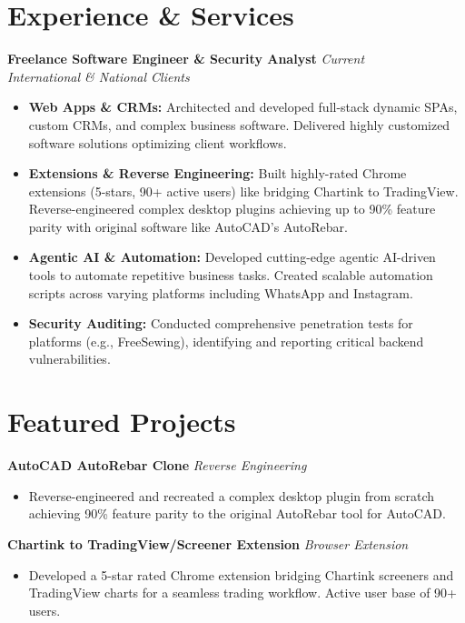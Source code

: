 \documentclass[11pt,a4paper]{article}
\begin{document}
\section{Experience \& Services}
\textbf{Freelance Software Engineer \& Security Analyst} \hfill \textit{Current} \\
\textit{International \& National Clients}
\begin{itemize}[leftmargin=0.25in]
    \item \textbf{Web Apps \& CRMs:} Architected and developed full-stack dynamic SPAs, custom CRMs, and complex business software. Delivered highly customized software solutions optimizing client workflows.
    \item \textbf{Extensions \& Reverse Engineering:} Built highly-rated Chrome extensions (5-stars, 90+ active users) like bridging Chartink to TradingView. Reverse-engineered complex desktop plugins achieving up to 90\% feature parity with original software like AutoCAD's AutoRebar.
    \item \textbf{Agentic AI \& Automation:} Developed cutting-edge agentic AI-driven tools to automate repetitive business tasks. Created scalable automation scripts across varying platforms including WhatsApp and Instagram.
    \item \textbf{Security Auditing:} Conducted comprehensive penetration tests for platforms (e.g., FreeSewing), identifying and reporting critical backend vulnerabilities.
\end{itemize}

\section{Featured Projects}
\textbf{AutoCAD AutoRebar Clone} \hfill \textit{Reverse Engineering}
\begin{itemize}[leftmargin=0.25in]
    \item Reverse-engineered and recreated a complex desktop plugin from scratch achieving 90\% feature parity to the original AutoRebar tool for AutoCAD.
\end{itemize}

\textbf{Chartink to TradingView/Screener Extension} \hfill \textit{Browser Extension}
\begin{itemize}[leftmargin=0.25in]
    \item Developed a 5-star rated Chrome extension bridging Chartink screeners and TradingView charts for a seamless trading workflow. Active user base of 90+ users.
\end{itemize}
\end{document}
